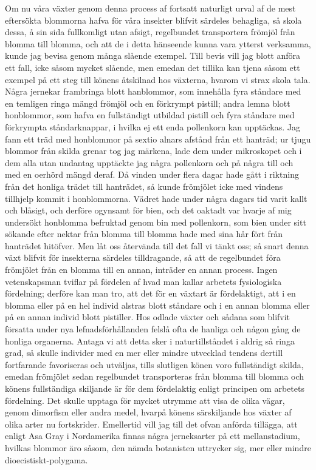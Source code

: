 Om nu våra växter genom denna process af fortsatt naturligt urval af de mest eftersökta blommorna hafva för våra insekter blifvit särdeles behagliga, så skola dessa, å sin sida fullkomligt utan afsigt, regelbundet transportera frömjöl från blomma till blomma, och att de i detta hänseende kunna vara ytterst verksamma, kunde jag bevisa genom många slående exempel. Till bevis vill jag blott anföra ett fall, icke såsom mycket slående, men emedan det tillika kan tjena såsom ett exempel på ett steg till könens åtskilnad hos växterna, hvarom vi strax skola tala. Några jernekar frambringa blott hanblommor, som innehålla fyra ståndare med en temligen ringa mängd frömjöl och en förkrympt pistill; andra lemna blott honblommor, som hafva en fullständigt utbildad pistill och fyra ståndare med förkrympta ståndarknappar, i hvilka ej ett enda pollenkorn kan upptäckas. Jag fann ett träd med honblommor på sextio alnars afstånd från ett hanträd; ur tjugu blommor från skilda grenar tog jag märkena, lade dem under mikroskopet och i dem alla utan undantag upptäckte jag några pollenkorn och på några till och med en oerhörd mängd deraf. Då vinden under flera dagar hade gått i riktning från det honliga trädet till hanträdet, så kunde frömjölet icke med vindens tillhjelp kommit i honblommorna. Vädret hade under några dagars tid varit kallt och blåsigt, och derföre ogynsamt för bien, och det oaktadt var hvarje af mig undersökt honblomma befruktad genom bin med pollenkorn, som bien under sitt sökande efter nektar från blomma till blomma hade med sina hår fört från hanträdet hitöfver. Men låt oss återvända till det fall vi tänkt oss; så snart denna växt blifvit för insekterna särdeles tilldragande, så att de regelbundet föra frömjölet från en blomma till en annan, inträder en annan process. Ingen vetenskapsman tviflar på fördelen af hvad man kallar arbetets fysiologiska fördelning; derföre kan man tro, att det för en växtart är fördelaktigt, att i en blomma eller på en hel individ alstras blott ståndare och i en annan blomma eller på en annan individ blott pistiller. Hos odlade växter och sådana som blifvit försatta under nya lefnadsförhållanden felslå ofta de hanliga och någon gång de honliga organerna. Antaga vi att detta sker i naturtillståndet i aldrig så ringa grad, så skulle individer med en mer eller mindre utvecklad tendens dertill fortfarande favoriseras och utväljas, tills slutligen könen voro fullständigt skilda, emedan frömjölet sedan regelbundet transporteras från blomma till blomma och könens fullständiga skiljande är för dem fördelaktig enligt principen om arbetets fördelning. Det skulle upptaga för mycket utrymme att visa de olika vägar, genom dimorfism eller andra medel, hvarpå könens särskiljande hos växter af olika arter nu fortskrider. Emellertid vill jag till det ofvan anförda tillägga, att enligt Asa Gray i Nordamerika finnas några jerneksarter på ett mellanstadium, hvilkas blommor äro såsom, den nämda botanisten uttrycker sig, mer eller mindre dioecistiskt-polygama.

